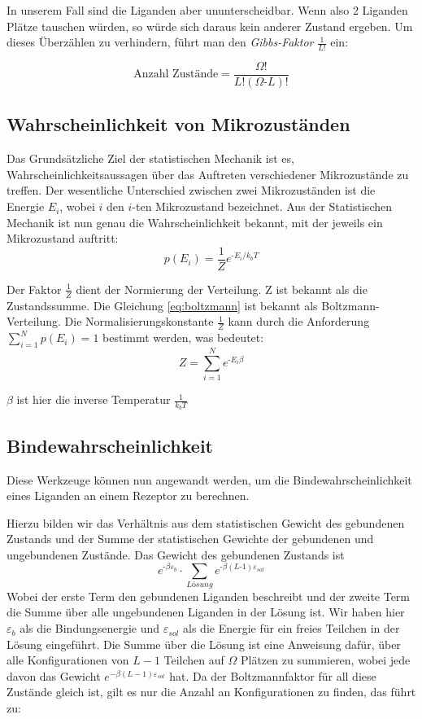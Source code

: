 \documentclass[bachelor,       %
               twoside,        %
               BCOR10mm,       %
               english,ngerman, %
               ]{GAUBM}
\begin{document}
In unserem Fall sind die Liganden aber ununterscheidbar. Wenn also 2 Liganden
Plätze tauschen würden, so würde sich daraus kein anderer Zustand ergeben. Um
dieses Überzählen zu verhindern, führt man den \emph{Gibbs-Faktor} $\frac{1}{L!}$
ein:

\begin{equation}
\label{zustaende}
\text{Anzahl Zustände} = \frac{\Omega!}{L!(\Omega\text{-}L)!}
\end{equation}

\subsection{Wahrscheinlichkeit von Mikrozuständen}
Das Grundsätzliche Ziel der statistischen Mechanik ist es, Wahrscheinlichkeitsaussagen
über das Auftreten verschiedener Mikrozustände zu treffen. Der wesentliche Unterschied
zwischen zwei Mikrozuständen ist die Energie $E_i$, wobei $i$ den $i$-ten Mikrozustand
bezeichnet. Aus der Statistischen Mechanik ist nun genau die Wahrscheinlichkeit
bekannt, mit der jeweils ein Mikrozustand auftritt:
\begin{equation}
  \label{eq:boltzmann}
  p(E_i) = \frac{1}{Z} e^{\text{-}E_i\text{/}k_bT}
\end{equation}

Der Faktor $\frac{1}{Z}$ dient der Normierung der Verteilung.
Z ist bekannt als die Zustandssumme. Die Gleichung \ref{eq:boltzmann}
ist bekannt als Boltzmann-Verteilung. Die Normalisierungskonstante $\frac{1}{Z}$
kann durch die Anforderung $ \sum_{i=1}^{N} p(E_i) = 1$ bestimmt werden, was bedeutet:
\begin{equation}
Z = \sum_{i=1}^{N}e^{\text{-}E_i\beta}
\end{equation}

$\beta$ ist hier die inverse Temperatur $\frac{1}{k_bT}$

\subsection{Bindewahrscheinlichkeit}
Diese Werkzeuge können nun angewandt werden, um die Bindewahrscheinlichkeit eines
Liganden an einem Rezeptor zu berechnen.

Hierzu bilden wir das Verhältnis aus dem statistischen Gewicht des gebundenen
Zustands und der Summe der statistischen Gewichte der gebundenen und ungebundenen
Zustände. Das Gewicht des gebundenen Zustands ist
$$e^{\text{-}\beta\varepsilon_b} \cdot \sum_{Lösung}e^{\text{-}\beta(L\text{-}1)\varepsilon_{sol}}$$
Wobei der erste Term den gebundenen Liganden beschreibt und der zweite Term die Summe
über alle ungebundenen Liganden in der Lösung ist. Wir haben hier $\varepsilon_b$ als
die Bindungsenergie und $\varepsilon_{sol}$ als die Energie für ein freies Teilchen
in der Lösung eingeführt. Die Summe über die Lösung ist eine Anweisung dafür,
über alle Konfigurationen von $L-1$ Teilchen auf $\Omega$ Plätzen zu summieren,
wobei jede davon das Gewicht $e^{-\beta(L-1)\varepsilon_{sol}}$ hat.
Da der Boltzmannfaktor für all diese Zustände gleich ist, gilt es nur
die Anzahl an Konfigurationen zu finden, das führt zu:
\end{document}
